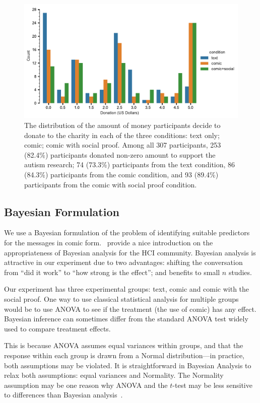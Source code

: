 \begin{figure}[htb]
	\includegraphics[width=1\textwidth]{./figures/contributions_across_conditions.pdf}
    \caption{The distribution of the amount of money participants decide to donate to the charity in each of the three conditions: text only; comic; comic with social proof. Among all 307 participants, 253 (82.4\%) participants donated non-zero amount to support the autism research; 74 (73.3\%) participants from the text condition, 86 (84.3\%) participants from the comic condition, and 93 (89.4\%) participants from the comic with social proof condition.
}
	\label{fig:contributions across conditions}
\end{figure}

\subsection{Bayesian Formulation}
\label{sub:Bayesian Formulation}
We use a Bayesian formulation of the problem of identifying suitable predictors for the messages in comic form.~\textcite{Kay2016} provide a nice introduction on the appropriateness of Bayesian analysis for the HCI community. Bayesian analysis is attractive in our experiment due to two advantages: shifting the conversation from ``did it work'' to ``how strong is the effect''; and benefits to small $n$ studies. 

Our experiment has three experimental groups: text, comic and comic with the social proof. One way to use classical statistical analysis for multiple groups would be to use ANOVA to see if the treatment (the use of comic) has any effect.  Bayesian inference can sometimes differ from the standard ANOVA test widely used to compare treatment effects.


This is because ANOVA assumes equal variances within groups, and that the response within each group is drawn from a Normal distribution---in practice, both assumptions may be violated.  It is straightforward in Bayesian Analysis to relax both assumptions: equal variances and Normality. The Normality assumption may be one reason why ANOVA and the $t$-test may be less sensitive to differences than Bayesian analysis~\parencite[][p. 470]{Kruschke2014}.

